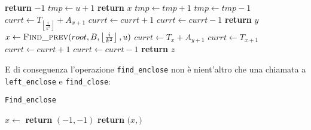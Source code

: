 \documentclass{article}
\begin{document}
    \begin{algorithm}[H]
    \begin{algorithmic}[1]
            \State \textbf{return} $-1$ 
        \EndIf
        \State
        \State $tmp\gets u+1$
                \State \textbf{return} $x$
            \EndIf
                \State $tmp\gets tmp+1$
            \EndIf
                \State $tmp\gets tmp-1$
            \EndIf
        \EndFor
        \State
                \State $currt\gets T_{\left\lfloor{\frac{i}{k^2}}\right\rfloor}+A_{x+1}$
                        \State $currt\gets currt+1$
                    \EndIf
                        \State $currt\gets currt-1$
                    \EndIf
                        \State \textbf{return} $y$
                    \EndIf
                \EndFor
            \EndIf
        \EndFor
        \State
        \State $x\gets \Call{Find\_prev}{root,B,\left\lfloor{\frac{i}{k^2}}\right\rfloor,u}$ 
                    \State $currt\gets T_x+A_{y+1}$
                \Else
                    \State $currt\gets T_{x+1}$
                \EndIf
                        \State $currt\gets currt+1$
                    \EndIf
                        \State $currt\gets currt-1$
                    \EndIf
                        \State \textbf{return} $z$
                    \EndIf
                \EndFor
            \EndIf
        \EndFor
    \EndProcedure
    \end{algorithmic}
    \end{algorithm}
E di conseguenza l'operazione \texttt{find\_enclose} non è nient'altro che una chiamata a \texttt{left\_enclose} e \texttt{find\_close}:
    \begin{algorithm}[H]
    \caption{\texttt{Find\_enclose}}\label{findenclose}
    \begin{algorithmic}[1]
    \State $x\gets$ 
        \State \textbf{return} $(-1,-1)$ 
    \Else
        \State \textbf{return} $(x,$$)$
    \EndIf
    \EndProcedure
    \end{algorithmic}
    \end{algorithm}
\end{document}
